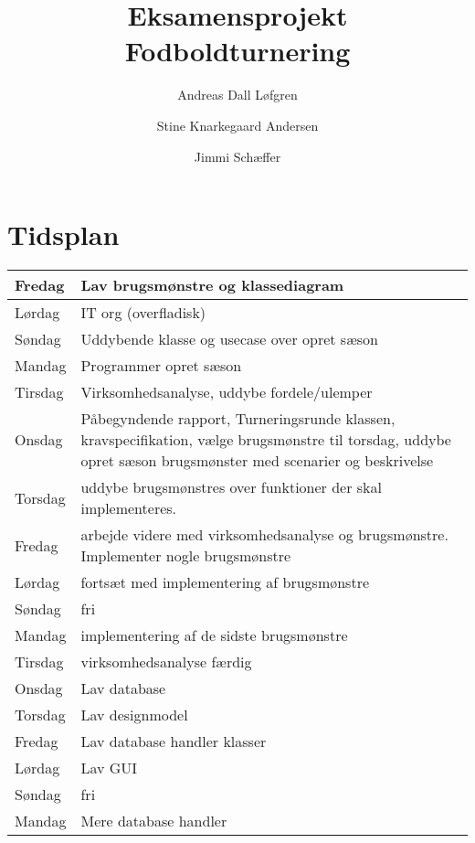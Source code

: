\documentclass[11pt]{article}
\title%
{%
	{\large Eksamensprojekt}\\
	Fodboldturnering
}
\author%
{%
	Andreas Dall Løfgren\\
	\and
	Stine Knarkegaard Andersen\\
	\and
	Jimmi Schæffer\\
}
\begin{document}
\maketitle
\tableofcontents
\pagebreak

\section*{Tidsplan}
\begin{tabular}{ l | p{10cm} }
Fredag & Lav brugsmønstre og klassediagram \\ \hline

Lørdag & IT org (overfladisk)\\ \hline

Søndag & Uddybende klasse og usecase over opret sæson\\ \hline

Mandag & Programmer opret sæson\\ \hline

Tirsdag & Virksomhedsanalyse, uddybe fordele/ulemper\\ \hline

Onsdag & Påbegyndende rapport, Turneringsrunde klassen, kravspecifikation, vælge brugsmønstre til torsdag, uddybe opret sæson brugsmønster med scenarier og beskrivelse\\ \hline

Torsdag & uddybe brugsmønstres over funktioner der skal implementeres.\\ \hline

Fredag & arbejde videre med virksomhedsanalyse og brugsmønstre. Implementer nogle brugsmønstre\\ \hline

Lørdag & fortsæt med implementering af brugsmønstre\\ \hline

Søndag & fri\\ \hline

Mandag & implementering af de sidste brugsmønstre\\ \hline

Tirsdag & virksomhedsanalyse færdig\\ \hline

Onsdag & Lav database\\ \hline

Torsdag & Lav designmodel\\ \hline

Fredag & Lav database handler klasser\\ \hline

Lørdag & Lav GUI\\ \hline

Søndag & fri\\ \hline

Mandag & Mere database handler\\ \hline
\end{tabular}\\
\end{document}
